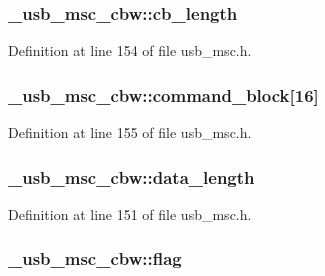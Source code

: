 \subsubsection[{\texorpdfstring{cb\+\_\+length}{cb_length}}]{ \+\_\+usb\+\_\+msc\+\_\+cbw\+::cb\+\_\+length}\hypertarget{struct__usb__msc__cbw_a9572217046b63d946d64b09033d44e37}{}\label{struct__usb__msc__cbw_a9572217046b63d946d64b09033d44e37}


Definition at line 154 of file usb\+\_\+msc.\+h.

\subsubsection[{\texorpdfstring{command\+\_\+block}{command_block}}]{ \+\_\+usb\+\_\+msc\+\_\+cbw\+::command\+\_\+block\mbox{[}16\mbox{]}}\hypertarget{struct__usb__msc__cbw_a1479f0dc898b6b2baa289bab24ce45f4}{}\label{struct__usb__msc__cbw_a1479f0dc898b6b2baa289bab24ce45f4}


Definition at line 155 of file usb\+\_\+msc.\+h.

\subsubsection[{\texorpdfstring{data\+\_\+length}{data_length}}]{ \+\_\+usb\+\_\+msc\+\_\+cbw\+::data\+\_\+length}\hypertarget{struct__usb__msc__cbw_ab8c307d0404180da45f915ce5ec71548}{}\label{struct__usb__msc__cbw_ab8c307d0404180da45f915ce5ec71548}


Definition at line 151 of file usb\+\_\+msc.\+h.

\subsubsection[{\texorpdfstring{flag}{flag}}]{ \+\_\+usb\+\_\+msc\+\_\+cbw\+::flag}\hypertarget{struct__usb__msc__cbw_a309f368b2b373120a48b9306e7871286}{}\label{struct__usb__msc__cbw_a309f368b2b373120a48b9306e7871286}


